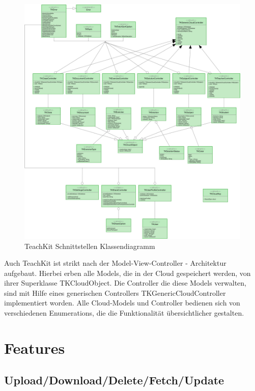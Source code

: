 \begin{figure}
  \includegraphics[width=\linewidth]{images/Klassendiagram_TeachKit.jpg}
  \caption{TeachKit Schnittstellen Klassendiagramm}
  \label{fig:boat1}
\end{figure}

Auch TeachKit ist strikt nach der Model-View-Controller - Architektur aufgebaut. Hierbei erben alle Models, die in der Cloud gespeichert werden, von ihrer Superklasse TKCloudObject. Die Controller die diese Models verwalten, sind mit Hilfe eines generischen Controllers TKGenericCloudController implementiert worden. Alle Cloud-Models und Controller bedienen sich von verschiedenen Enumerations, die die Funktionalität übersichtlicher gestalten.

\newpage


\section{Features}

\subsection{Upload/Download/Delete/Fetch/Update}

